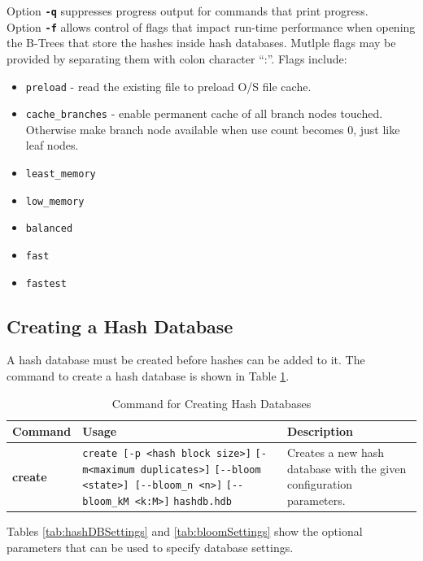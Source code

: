 \documentclass[11pt,fleqn]{article} %
\begin{document}
Option \textbf{\texttt{-q}} suppresses progress output for commands that print progress.\\

Option \textbf{\texttt{-f}} allows control of flags that impact run-time performance when opening the B-Trees that store the hashes inside hash databases.
Mutlple flags may be provided by separating them with colon character ``:''.
Flags include:
\begin{itemize}
\item \texttt{preload} - read the existing file to preload O/S file cache.
\item \texttt{cache\_branches} - enable permanent cache of all branch nodes touched. Otherwise make branch node available when use count becomes 0, just like leaf nodes.
\item \texttt{least\_memory}
\item \texttt{low\_memory}
\item \texttt{balanced}
\item \texttt{fast}
\item \texttt{fastest}
\end{itemize}


\subsection{Creating a Hash Database}
A hash database must be created before hashes can be added to it.
The command to create a hash database is shown in Table \ref{tab:createDatabase}.
\begin{table}[!ht]
\centering
\caption{Command for Creating Hash Databases}
\label{tab:createDatabase}
\begin{tabular}{|p{2.5 cm}|p{7 cm}|p{4 cm}|}
\hline \hline
\textbf{Command} & \textbf{Usage} & \textbf{Description} \\
\hline
\textbf{create} & \verb+create [-p <hash block size>]+ \verb+[-m<maximum duplicates>]+ \verb+[--bloom <state>] [--bloom_n <n>]+ \verb+[--bloom_kM <k:M>]+ \verb+hashdb.hdb+ & Creates a new hash database with the given configuration parameters.\\
\hline
\end{tabular}
\end{table}

Tables \ref{tab:hashDBSettings} and \ref{tab:bloomSettings} show the optional parameters that can be used to specify database settings.\\
\end{document}
